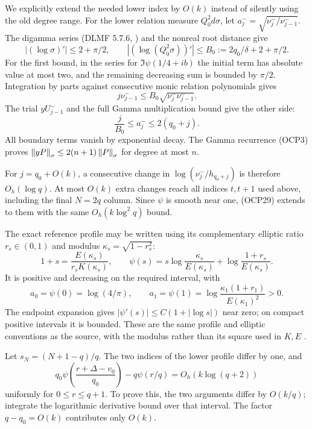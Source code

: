 \documentclass[10pt]{article}
\begin{document}
We explicitly extend the needed lower index by $O(k)$ instead of silently using the old degree range. For the lower relation measure $Q_0^2d\sigma$, let $a_j^-=\sqrt{\nu_j^-/\nu_{j-1}^-}$. The digamma series (DLMF 5.7.6, \cite{dlmfgamma}) and the nonreal root distance give
\[
 |(\log\sigma)'|\le2+\pi/2,\qquad
 |(\log(Q_0^2\sigma))'|\le B_0:=2q_0/\delta+2+\pi/2.
\]
For the first bound, in the series for $\Im\psi(1/4+ib)$ the initial term has absolute value at most two, and the remaining decreasing sum is bounded by $\pi/2$. Integration by parts against consecutive monic relation polynomials gives
\[
 j\nu_{j-1}^-\le B_0\sqrt{\nu_j^-\nu_{j-1}^-}.
\]
The trial $yU_{j-1}^-$ and the full Gamma multiplication bound give the other side:
\[
 \boxed{\frac j{B_0}\le a_j^-\le2(q_0+j).}
 \tag{OCP30}
\]
All boundary terms vanish by exponential decay. The Gamma recurrence (OCP3) proves $\left\lVert yP\right\rVert_\sigma\le2(n+1)\left\lVert P\right\rVert_\sigma$ for degree at most $n$.

For $j=q_0+O(k)$, a consecutive change in
$\log(\nu_j^-/h_{q_0+j})$ is therefore $O_h(\log q)$. At most $O(k)$ extra changes reach all indices $t,t+1$ used above, including the final $N=2q$ column. Since $\psi$ is smooth near one, (OCP29) extends to them with the same $O_h(k\log^2q)$ bound.

The exact reference profile may be written using its complementary elliptic ratio $r_s\in(0,1)$ and modulus $\kappa_s=\sqrt{1-r_s^2}$:
\[
 1+s=\frac{E(\kappa_s)}{r_sK(\kappa_s)},\qquad
 \psi(s)=s\log\frac{\kappa_s}{E(\kappa_s)}
 +\log\frac{1+r_s}{E(\kappa_s)}.
 \tag{OCP31}
\]
It is positive and decreasing on the required interval, with
\[
 a_0=\psi(0)=\log(4/\pi),\qquad
 a_1=\psi(1)=\log\frac{\kappa_1(1+r_1)}{E(\kappa_1)^2}>0.
\]
The endpoint expansion gives $|\psi'(s)|\le C(1+|\log s|)$ near zero; on compact positive intervals it is bounded. These are the same profile and elliptic conventions as the source, with the modulus rather than its square used in $K,E$ \cite{dlmfell,heat}.

Let $s_N=(N+1-q)/q$. The two indices of the lower profile differ by one, and
\[
 q_0\psi\left(\frac{r+\Delta-v_0}{q_0}\right)
 -q\psi(r/q)=O_h(k\log(q+2))
 \tag{OCP32}
\]
uniformly for $0\le r\le q+1$. To prove this, the two arguments differ by $O(k/q)$; integrate the logarithmic derivative bound over that interval. The factor $q-q_0=O(k)$ contributes only $O(k)$.
\end{document}
